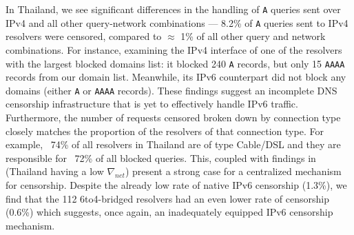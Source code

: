 In Thailand, we see significant differences in the handling of {\tt A} queries
sent over IPv4 and all other query-network combinations --- 8.2\% of \texttt{A}
queries sent to IPv4 resolvers were censored, compared to $\approx$ 1\% of all
other query and network combinations.
For instance, examining the IPv4 interface of one of the resolvers with the
largest blocked domains list: it blocked 240 \texttt{A} records, but only 15
\texttt{AAAA} records from our domain list. Meanwhile, its IPv6 counterpart did
not block any domains (either \texttt{A} or \texttt{AAAA} records). These
findings suggest an incomplete DNS censorship infrastructure that is yet to
effectively handle IPv6 traffic.
%
Furthermore, the number of requests censored broken down by connection type
closely matches the proportion of the resolvers of that connection type. For
example, ~74\% of all resolvers in Thailand are of type Cable/DSL and they are
responsible for ~72\% of all blocked queries. This, coupled with findings in
 (Thailand having a low $\nabla_{net}$)
present a strong case for a centralized mechanism for censorship.
%
Despite the already low rate of native IPv6 censorship (1.3\%), we find that
the 112 6to4-bridged resolvers had an even lower rate of censorship (0.6\%)
which suggests, once again, an inadequately equipped IPv6 censorship mechanism.






